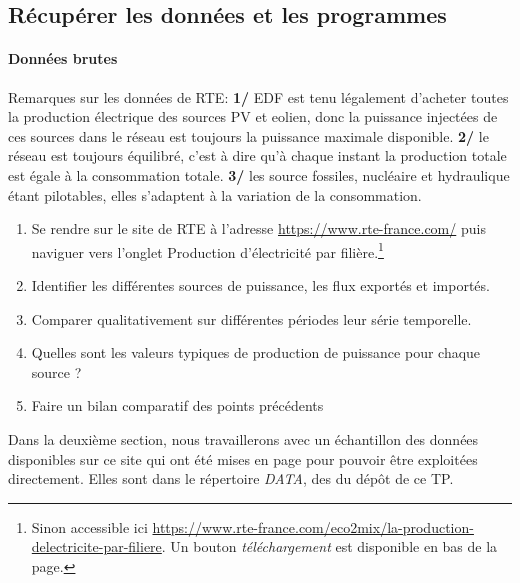 \documentclass[12pt,a4,french]{article}
\newcommand{\tmtextit}[1]{{\itshape{#1}}}
\begin{document}
\subsection{Récupérer les données et les programmes}

\paragraph{Données brutes}
Remarques sur les données de RTE: \textbf{1/} EDF est tenu légalement d'acheter toutes la production électrique des sources PV et eolien, donc la puissance injectées de ces sources dans le réseau est toujours la puissance maximale disponible. \textbf{2/} le réseau est toujours équilibré, c'est à dire qu'à chaque instant la production totale est égale à la consommation totale. \textbf{3/} les source fossiles, nucléaire et hydraulique étant pilotables, elles s'adaptent à la variation de la consommation.

\begin{enumerate}
    \item Se rendre sur le site de RTE à l'adresse 
    \href{https://www.rte-france.com/}{https://www.rte-france.com/} puis naviguer vers l'onglet Production d'électricité par filière.\footnote{Sinon accessible ici \href{https://www.rte-france.com/eco2mix/la-production-delectricite-par-filiere}{https://www.rte-france.com/eco2mix/la-production-delectricite-par-filiere}. Un bouton \textit{téléchargement} est disponible en bas de la page.}
    
    \item Identifier les différentes sources de puissance, les flux exportés et importés.
    
    \item  Comparer qualitativement sur différentes périodes leur série temporelle.
    
    \item Quelles sont les valeurs typiques de production de puissance pour chaque source ?
    
    \item Faire un bilan comparatif des points précédents
\end{enumerate}

Dans la deuxième section, nous travaillerons avec un échantillon des données disponibles sur ce site qui ont été mises en page pour pouvoir être exploitées directement.  Elles sont dans le répertoire \tmtextit{DATA}, des du dépôt de ce TP.
\end{document}
